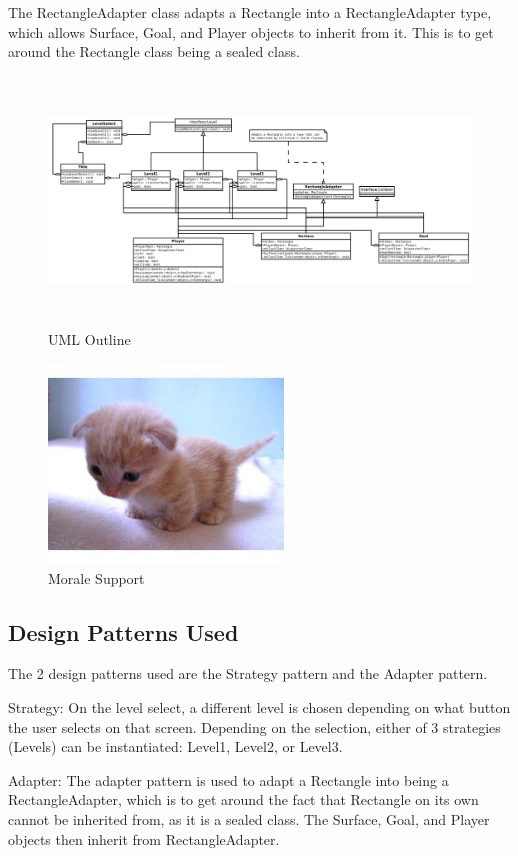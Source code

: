 \documentclass[10pt,conference,onecolumn,compsoc]{IEEEtran}
\begin{document}
The RectangleAdapter class adapts a Rectangle into a RectangleAdapter type, which allows Surface, Goal, and Player objects to inherit from it. This is to get around the Rectangle class being a sealed class.
\begin{figure}[ht!]
\includegraphics[height=250px, width=500px]{Penultimate_UML.png}
\caption{UML Outline}
\label{Facade}
\end{figure}

\begin{figure}[ht!]
\includegraphics[scale=1.5]{cat2.jpg}
\caption{Morale Support}
\label{cat2}
\end{figure}


\subsection{Design Patterns Used}
The 2 design patterns used are the Strategy pattern and the Adapter pattern.

Strategy: On the level select, a different level is chosen depending on what button the user selects on that screen. Depending on the selection, either of 3 strategies (Levels) can be instantiated: Level1, Level2, or Level3.

Adapter: The adapter pattern is used to adapt a Rectangle into being a RectangleAdapter, which is to get around the fact that Rectangle on its own cannot be inherited from, as it is a sealed class. The Surface, Goal, and Player objects then inherit from RectangleAdapter.
\end{document}
